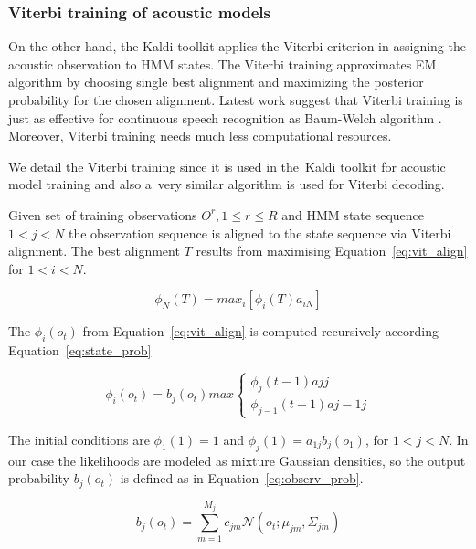 \subsubsection*{Viterbi training of acoustic models}
On the other hand, the Kaldi toolkit applies the Viterbi criterion in assigning the acoustic observation to \ac{HMM} states.
The Viterbi training approximates \ac{EM} algorithm by choosing single best alignment and maximizing the posterior probability for the chosen alignment.
Latest work suggest that Viterbi training is just as effective for continuous speech recognition as Baum-Welch algorithm \cite{rodriguez2003comparative}.
Moreover, Viterbi training needs much less computational resources. 

We detail the Viterbi training since it is used in the~Kaldi toolkit for acoustic model training and also a~very similar algorithm is used for Viterbi decoding.

Given set of training observations $O^r, 1 \le r \le R$ and \ac{HMM} state sequence $1<j< N$ the observation sequence is aligned to the state sequence via Viterbi alignment.\cite{buthpitiya2012parallel}
The best alignment $T$ results from maximising Equation~\ref{eq:vit_align} for $1<i< N$.

\begin{equation}\label{eq:vit_align}
    \phi_N(T)= max_i[\phi_i(T)a_{iN}] 
\end{equation}


The $\phi_i(o_t)$ from Equation~\ref{eq:vit_align} is computed recursively according Equation~\ref{eq:state_prob}

\begin{equation}\label{eq:state_prob}
    \phi_i(o_t) = b_j(o_t) max \left\{
  \begin{array}{lr}
      \phi_j(t-1)a{jj}\\
      \phi_{j-1}(t-1)a{j-1j}
  \end{array}
\right.
\end{equation}

The initial conditions are $\phi_1(1)=1$ and $\phi_j(1)= a_{1j}b_j(o_1)$, for $ 1 < j < N$.
In our case the likelihoods are modeled as mixture Gaussian densities, so the output probability $b_j(o_t)$ is defined as in Equation~\ref{eq:observ_prob}.

\begin{equation}\label{eq:observ_prob}
    b_j(o_t) = \sum_{m=1}^{M_j}{c_{jm}\mathcal{N}(o_t; \mu_{jm}, \Sigma_{jm})}
\end{equation}

